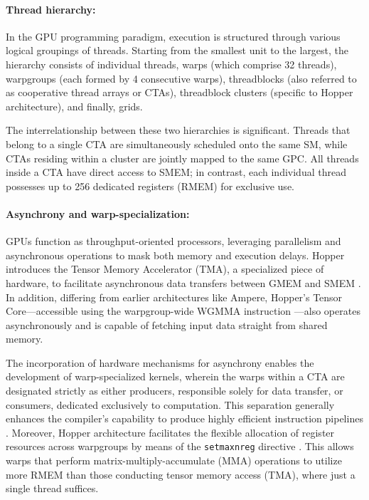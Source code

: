 \paragraph{Thread hierarchy:} In the GPU programming paradigm, execution is structured through various logical groupings of threads. Starting from the smallest unit to the largest, the hierarchy consists of individual threads, warps (which comprise 32 threads), warpgroups (each formed by 4 consecutive warps), threadblocks (also referred to as cooperative thread arrays or CTAs), threadblock clusters (specific to Hopper architecture), and finally, grids.

The interrelationship between these two hierarchies is significant. Threads that belong to a single CTA are simultaneously scheduled onto the same SM, while CTAs residing within a cluster are jointly mapped to the same GPC. All threads inside a CTA have direct access to SMEM; in contrast, each individual thread possesses up to 256 dedicated registers (RMEM) for exclusive use.

\paragraph{Asynchrony and warp-specialization:}

GPUs function as throughput-oriented processors, leveraging parallelism and asynchronous operations to mask both memory and execution delays. Hopper introduces the Tensor Memory Accelerator (TMA), a specialized piece of hardware, to facilitate asynchronous data transfers between GMEM and SMEM \cite[\S7.29]{cuda}. In addition, differing from earlier architectures like Ampere, Hopper's Tensor Core—accessible using the warpgroup-wide WGMMA instruction \cite[\S9.7.14]{ptx}—also operates asynchronously and is capable of fetching input data straight from shared memory.

The incorporation of hardware mechanisms for asynchrony enables the development of warp-specialized kernels, wherein the warps within a CTA are designated strictly as either producers, responsible solely for data transfer, or consumers, dedicated exclusively to computation. This separation generally enhances the compiler's capability to produce highly efficient instruction pipelines \citep{warp-specialization-2011}. Moreover, Hopper architecture facilitates the flexible allocation of register resources across warpgroups by means of the \verb|setmaxnreg| directive \cite[\S9.7.17.1]{ptx}. This allows warps that perform matrix-multiply-accumulate (MMA) operations to utilize more RMEM than those conducting tensor memory access (TMA), where just a single thread suffices.

